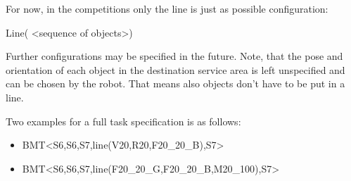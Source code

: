 For now, in the competitions only the line is just as possible configuration:
\par
Line( \textless sequence of objects\textgreater )
\par
Further configurations may be specified in the future. Note, that the pose and orientation of each object in the destination service area is left unspecified and can be chosen by the robot. That means also objects don’t have to be put in a line.

Two examples for a full task specification is as follows:
\begin{itemize}
	\item BMT\textless S6,S6,S7,line(V20,R20,F20\_20\_B),S7\textgreater
	\item BMT\textless S6,S6,S7,line(F20\_20\_G,F20\_20\_B,M20\_100),S7\textgreater
\end{itemize}

